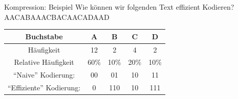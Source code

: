 \begin{frame}{Kompression: Beispiel}
	\centering
	Wie können wir folgenden Text effizient Kodieren?\\[.5cm]
	AACABAAACBACAACADAAD
	
	\begin{table}[H]
		\begin{tabular}{c|c|c|c|c}
			\textbf{Buchstabe} & \textbf{A} & \textbf{B} & \textbf{C} & \textbf{D} \\\midrule\midrule
			Häufigkeit & 12 &  2 & 4 & 2 \\\hline
			Relative Häufigkeit & 60\% & 10\% & 20\% & 10\% \\\hline
			``Naive'' Kodierung: & 00 & 01 & 10 & 11 \\\hline
			``Effiziente'' Kodierung: & 0 & 110  & 10&  111\\
		\end{tabular}

	\end{table}
\end{frame}

